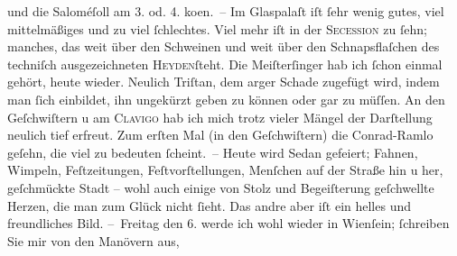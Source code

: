 \begin{ledgroupsized}[t]{13cm}
                    und die Saloméſoll am 3. od. 4.
                        ko{\geminationm}en. – Im Glaspalaſt iſt ſehr wenig gutes, viel mittelmäßiges und zu viel
                    ſchlechtes. Viel mehr iſt in der \textsc{Secession} zu ſehn; manches, das weit über den Schweinen und weit über den
                    Schnapsflaſchen des techniſch ausgezeichneten \textsc{Heyden}ſteht. Die Meiſterſinger hab ich ſchon einmal gehört, heute wieder. Neulich Triſtan, dem arger Schade zugefügt wird, indem
                    man ſich einbildet, ihn ungekürzt geben zu können oder gar zu müſſen. An den Geſchwiſtern u am \textsc{Clavigo} hab ich mich trotz vieler Mängel der Darſtellung {\pb}neulich tief erfreut. Zum erſten Mal (in den Geſchwiſtern) die Conrad-Ramlo geſehn, die viel zu bedeuten ſcheint. –
                    Heute wird Sedan gefeiert; Fahnen, Wimpeln,
                    Feſtzeitungen, Feſtvorſtellungen, Menſchen auf der Straße hin u her, geſchmückte
                    Stadt – wohl auch einige von Stolz und Begeiſterung geſchwellte Herzen, die man
                    zum Glück nicht ſieht. Das andre aber iſt ein helles und freundliches Bild.\pend
           \pstart
           – Freitag den 6. werde ich wohl wieder in Wienſein; ſchreiben Sie mir von den Manövern aus,

\end{ledgroupsized}
